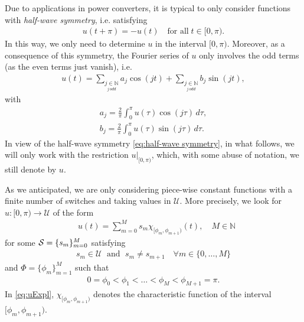 \documentclass[twocolumn]{autart}    %
\begin{document}
Due to applications in power converters,  it is typical to only consider functions with \textit{half-wave symmetry}, i.e. satisfying
\begin{align}\label{eq:half-wave symmetry}
	u(t + \pi) = -u(t)\quad \mbox{for all}\; t \in [0,\pi).
\end{align}
In this way, we only need to determine $u$ in the interval $[0,\pi)$. Moreover, as a consequence of this symmetry, the Fourier series of $u$ only involves the odd terms (as the even terms just vanish), i.e.
\begin{align*}
	u(t) = \sum_{\underset{j\, odd}{j \in \mathbb{N}}} a_j \cos(jt)+ \sum_{\underset{j\, odd}{j \in \mathbb{N}}}  b_j \sin(jt),
\end{align*}
with
\begin{equation} \label{eq:an}
	\begin{aligned}
		a_j = \frac{2}{\pi} \int_0^\pi u(\tau ) \cos(j \tau)\,d\tau, 
		\\[5pt]
		b_j = \frac{2}{\pi} \int_0^\pi u(\tau)  \sin(j \tau)\,d\tau.
	\end{aligned}
\end{equation}
In view of the half-wave symmetry \eqref{eq:half-wave symmetry}, in what follows, we will only work with the restriction $u|_{[0,\pi)}$, which, with some abuse of notation, we still denote by $u$. 

As we anticipated,  we are only considering piece-wise constant functions with a finite number of switches and taking values in $\mathcal{U}$.
More precisely, we look for $u: [0,\pi)\to \mathcal{U}$ of the form
\begin{align}\label{eq:uExpl}
	&u (t)= \sum_{m=0}^M s_m\chi_{[\phi_m,\phi_{m+1})} (t), \quad M\in\mathbb{N} 
\end{align}
for some $\mathcal{S} = \{ s_m\}_{m=0}^M$ satisfying
\begin{align*}
	s_m\in \mathcal{U} \; \text{ and } \; s_m\neq s_{m+1} \quad \forall m\in \{0,\ldots, M\}
\end{align*}
and $\Phi = \{ \phi_m\}_{m=1}^{M}$ such that
\begin{align*}
	0= \phi_0 < \phi_1 <\ldots < \phi_M < \phi_{M+1} = \pi .
\end{align*}
In \eqref{eq:uExpl}, $\chi_{[\phi_m,\phi_{m+1})}$ denotes the characteristic function of the interval $[\phi_m,\phi_{m+1})$. 

\bigskip
\end{document}
